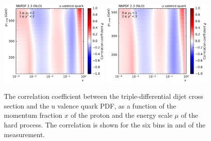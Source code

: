 \begin{figure}[htbp]
    \includegraphics[width=0.49\textwidth]{figures/pdf_constraints/corr_PTMAXEXPYS_YBYS_NLO_FINALBINS_NNPDF23_u_valence_quark_ys1_0yb1_0_cl.pdf}\hfill
    \includegraphics[width=0.49\textwidth]{figures/pdf_constraints/corr_PTMAXEXPYS_YBYS_NLO_FINALBINS_NNPDF23_u_valence_quark_ys2_0yb0_0_cl.pdf}\hfill
    \caption[Correlation between dijet cross section and u valence quark PDF]{
            The correlation coefficient between the triple-differential dijet cross
            section and the u valence quark PDF, as a function of the momentum fraction $x$ of the
            proton and the energy scale $\mu$ of the hard process. The correlation is shown
            for the six bins in \ystar and \yboost of the measurement.}

    \label{fig:pdfconstraints_u_valence_quark}
\end{figure}

